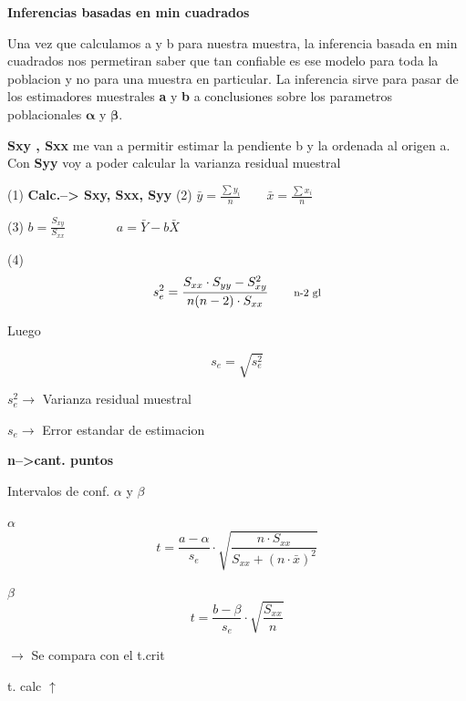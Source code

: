 \documentclass[10pt,a4paper]{article}
\begin{document}
\begin{center}
{\large\bfseries Inferencias basadas en min cuadrados}
\end{center}
\vspace{-2pt}

Una vez que calculamos a y b para nuestra muestra, la inferencia basada en min cuadrados nos permetiran saber que tan confiable es ese modelo para toda la poblacion y no para una muestra en particular. La inferencia sirve para pasar de los estimadores muestrales \textbf{a} y \textbf{b} a conclusiones sobre los parametros poblacionales $\boldsymbol{\alpha}$ y $\boldsymbol{\beta}$.

\textbf{Sxy , Sxx} me van a permitir estimar la pendiente b y la ordenada al origen a. Con \textbf{Syy} voy a poder calcular la varianza residual muestral

\begin{center}
{\small (1)} \textbf{Calc.--> Sxy, Sxx, Syy}
\qquad\qquad
{\small (2)} $\displaystyle \bar{y} = \frac{\sum y_i}{n} \qquad \bar{x} = \frac{\sum x_i}{n}$
\end{center}

\begin{center}
{\small (3)} \quad $\displaystyle b = \frac{S_{xy}}{S_{xx}} \qquad\qquad a = \bar{Y} - b\bar{X}$
\end{center}

\begin{minipage}[t]{0.46\textwidth}
\vspace{0pt}
{\small (4)}
\[
s_e^2 = \frac{S_{xx}\cdot S_{yy} - S_{xy}^2}{n(n-2)\cdot S_{xx}}
\qquad \text{\footnotesize n-2 gl}
\]
\centerline{Luego}
\[
s_e = \sqrt{s_e^2}
\]
\end{minipage}\hfill
\begin{minipage}[t]{0.50\textwidth}
\vspace{6pt}
{\small
$s_e^2 \longrightarrow$ Varianza residual muestral

$s_e \longrightarrow$ Error estandar de estimacion

\textbf{n-->cant. puntos}
}
\end{minipage}

\centerline{Intervalos de conf. $\alpha$ y $\beta$}

\begin{center}
\begin{minipage}{0.42\textwidth}
\centering
$\alpha$
\[
t = \frac{a-\alpha}{s_e}\cdot \sqrt{\frac{n\cdot S_{xx}}{S_{xx}+(n\cdot\bar{x})^2}}
\]
\end{minipage}
\begin{minipage}{0.42\textwidth}
\centering
$\beta$
\[
t = \frac{b-\beta}{s_e}\cdot \sqrt{\frac{S_{xx}}{n}}
\]
\end{minipage}
\hfill {\small $\longrightarrow$ Se compara con el t.crit}
\end{center}
\vspace{-4pt}
\hfill{\small t. calc $\uparrow$}\hspace{5.2cm}
\end{document}
